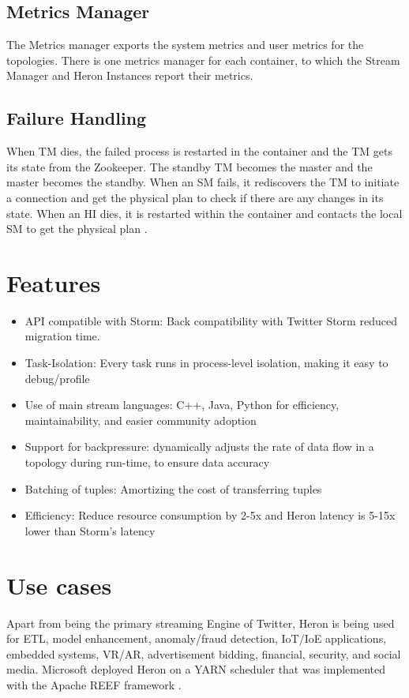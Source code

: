 \documentclass[9pt,twocolumn,twoside]{styles/osajnl}
\begin{document}
\subsection{Metrics Manager}
The Metrics manager exports the system metrics and user metrics for the topologies. There is one metrics
manager for each container, to which the Stream Manager and Heron Instances report their metrics.
\subsection{Failure Handling}
When TM dies, the failed process is restarted in the container and the TM gets its state from the Zookeeper. The standby TM becomes the master and the master becomes the standby. When an SM fails, it rediscovers the TM to initiate a connection and get the physical plan to check if there are any changes in its state. When an HI dies, it is restarted within the container and contacts the local SM to get the physical plan \cite{TwitterHeron4}.

\section{Features}
\begin{itemize}
    \item API compatible with Storm: Back compatibility with Twitter Storm reduced migration time. 
    \item Task-Isolation: Every task runs in process-level isolation, making it easy to debug/profile
    \item Use of main stream languages: C++, Java, Python for efficiency, maintainability, and easier community adoption
    \item Support for backpressure: dynamically adjusts the rate of data flow in a topology during run-time, to ensure data accuracy
    \item Batching of tuples: Amortizing the cost of transferring tuples
    \item Efficiency: Reduce resource consumption by 2-5x and Heron latency is 5-15x lower than Storm’s latency \cite{www-FlyFasterHeron}
\end{itemize}
\section{Use cases}
Apart from being the primary streaming Engine of Twitter, Heron is being used for ETL, model enhancement, anomaly/fraud detection, IoT/IoE applications, embedded systems, VR/AR, advertisement bidding, financial, security, and social media\cite{www-openSourceHeron}. Microsoft deployed Heron on a YARN scheduler that was implemented with the Apache REEF framework \cite{www-HeronYARN}.
\end{document}
